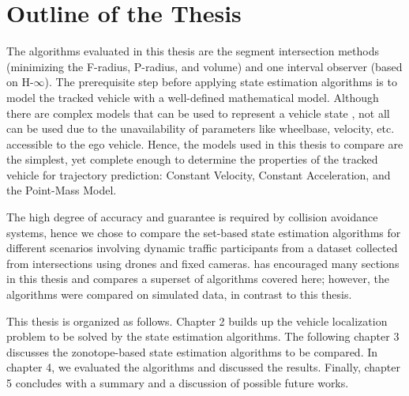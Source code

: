 \section{Outline of the Thesis}
The algorithms evaluated in this thesis are the segment intersection methods (minimizing the F-radius, P-radius, and volume) and one interval observer (based on H-$\infty$). The prerequisite step before applying state estimation algorithms is to model the tracked vehicle with a well-defined mathematical model. Although there are complex models that can be used to represent a vehicle state \cite{Althoff}, not all can be used due to the unavailability of parameters like wheelbase, velocity, etc. accessible to the ego vehicle. Hence, the models used in this thesis to compare are the simplest, yet complete enough to determine the properties of the tracked vehicle for trajectory prediction: Constant Velocity, Constant Acceleration, and the Point-Mass Model.

The high degree of accuracy and guarantee is required by collision avoidance systems, hence we chose to compare the set-based state estimation algorithms for different scenarios involving dynamic traffic participants from a dataset collected from intersections using drones and fixed cameras. \cite{Rath} has encouraged many sections in this thesis and compares a superset of algorithms covered here; however, the algorithms were compared on simulated data, in contrast to this thesis.

This thesis is organized as follows. Chapter 2 builds up the vehicle localization problem to be solved by the state estimation algorithms. The following chapter 3 discusses the zonotope-based state estimation algorithms to be compared. In chapter 4, we evaluated the algorithms and discussed the results. Finally, chapter 5 concludes with a summary and a discussion of possible future works.




